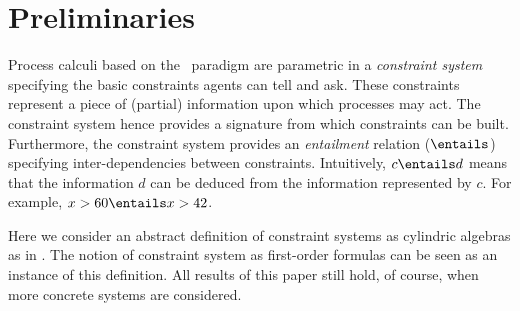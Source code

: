 \documentclass{tlp}
\begin{document}
\section{Preliminaries} \label{sec:cc}
Process calculi based on the \ccp\ paradigm are parametric in a
\emph{constraint system} specifying the basic constraints  agents can tell and ask.  These constraints  represent
a piece of (partial) information  upon  which processes may act. The
constraint system hence provides a signature from which  constraints
can be built. Furthermore, the constraint system provides an
\emph{entailment} relation ($\entails$) specifying inter-dependencies
between constraints. Intuitively,  $c\entails d$  means that the
information $d$ can be deduced from the information represented by
$c$. For example, $x > 60 \entails x >42$. 

Here we consider an abstract definition of constraint systems as
cylindric algebras as in \cite{BoerPP95}. The notion of constraint system as first-order formulas  \cite{DBLP:conf/ccl/Smolka94,NPV02,Olarte:08:SAC}  can be
seen as an instance of this definition. All results of this paper
still hold, of course, when more concrete systems are considered. 
\end{document}
